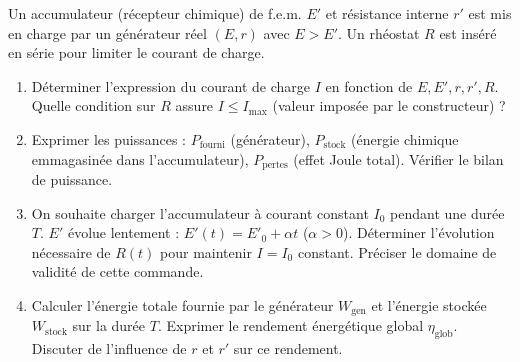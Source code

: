 \documentclass[11pt]{article}
\begin{document}
\begin{exercice}
Un accumulateur (récepteur chimique) de f.e.m. $E'$ et résistance interne $r'$ est mis en charge par un générateur réel $(E, r)$ avec $E > E'$. Un rhéostat $R$ est inséré en série pour limiter le courant de charge.
\begin{enumerate}
    \item Déterminer l'expression du courant de charge $I$ en fonction de $E, E', r, r', R$. Quelle condition sur $R$ assure $I \leq I_{\text{max}}$ (valeur imposée par le constructeur) ?
    \item Exprimer les puissances : $P_{\text{fourni}}$ (générateur), $P_{\text{stock}}$ (énergie chimique emmagasinée dans l'accumulateur), $P_{\text{pertes}}$ (effet Joule total). Vérifier le bilan de puissance.
    \item On souhaite charger l'accumulateur à courant constant $I_0$ pendant une durée $T$. $E'$ évolue lentement : $E'(t) = E'_0 + \alpha t$ ($\alpha > 0$). Déterminer l'évolution nécessaire de $R(t)$ pour maintenir $I = I_0$ constant. Préciser le domaine de validité de cette commande.
    \item Calculer l'énergie totale fournie par le générateur $W_{\text{gen}}$ et l'énergie stockée $W_{\text{stock}}$ sur la durée $T$. Exprimer le rendement énergétique global $\eta_{\text{glob}}$. Discuter de l'influence de $r$ et $r'$ sur ce rendement.
\end{enumerate}
\end{exercice}
\end{document}
